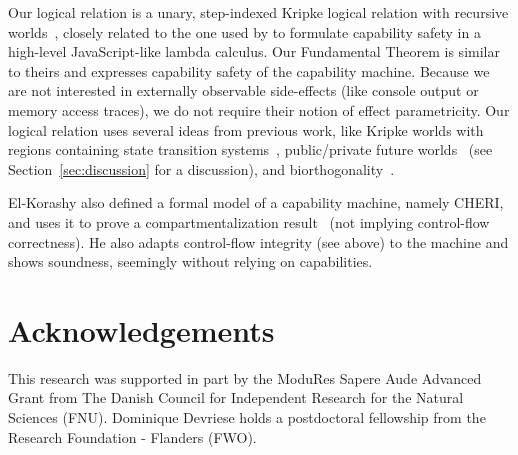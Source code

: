 \documentclass[compsoc,conference,letterpaper,fleqn]{IEEEtran}
\begin{document}
Our logical relation is a unary, step-indexed Kripke logical relation
with recursive
worlds~\citep{Appel:2001:IMR:504709.504712,Ahmed2004semantics,Birkedal:2011:SKM:1926385.1926401},
closely related to the one used by \citet{Devriese:2016ObjCap} to formulate
capability safety in a high-level JavaScript-like lambda calculus. Our
Fundamental Theorem is similar to theirs and expresses
capability safety of the capability machine. Because we are not interested in
externally observable side-effects (like console output or memory access
traces), we do not require their notion of effect parametricity. Our logical
relation uses several ideas from previous work, like Kripke worlds with regions
containing state transition systems~\citep{Ahmed:popl09}, public/private future
worlds~\citep{Dreyer:jfp12} (see Section~\ref{sec:discussion} for a discussion), and
biorthogonality~\citep{pitts_operational_1998,benton_biorthogonality_2009-1,Hur:2011:KLR:1926385.1926402}.

El-Korashy also defined a formal model of a capability machine, namely CHERI,
and uses it to prove a compartmentalization
result~\citep{akram_el-korashy_formal_2016} (not implying control-flow
correctness). He also adapts control-flow integrity (see above) to the machine
and shows soundness, seemingly without relying on capabilities.


\section*{Acknowledgements}
\label{sec:acknowledgements}

This research was supported in part by the ModuRes Sapere Aude Advanced Grant from The Danish Council for Independent Research for the Natural Sciences (FNU).
Dominique Devriese holds a postdoctoral fellowship from the Research Foundation - Flanders (FWO).


% 
%

\end{document}
